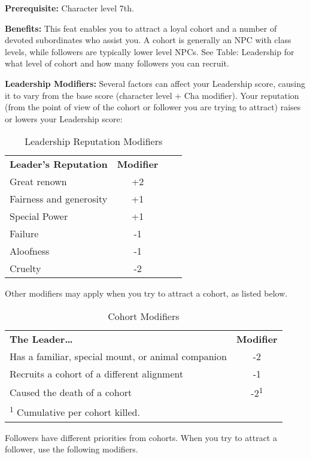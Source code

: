 \textbf{Prerequisite:} Character level 7th.
				
\textbf{Benefits:} This feat enables you to attract a loyal cohort and a number of devoted subordinates who assist you. A cohort is generally an NPC with class levels, while followers are typically lower level NPCs. See Table: Leadership for what level of cohort and how many followers you can recruit.
				
\textbf{Leadership Modifiers:} Several factors can affect your Leadership score, causing it to vary from the base score (character level + Cha modifier). Your reputation (from the point of view of the cohort or follower you are trying to attract) raises or lowers your Leadership score:
				
\begin{table}[htb]
\sffamily
{}
\caption{Leadership Reputation Modifiers}
\centering
\begin{tabular}{l c c c}
\textbf{Leader's Reputation} & \textbf{Modifier}\\
Great renown & +2\\
Fairness and generosity & +1\\
Special Power & +1\\
Failure & -1 \\
Aloofness & -1\\
Cruelty & -2\\
\end{tabular}
\end{table}
				
Other modifiers may apply when you try to attract a cohort, as listed below.\newline

\begin{table}[htb]
\sffamily
{}
\caption{Cohort Modifiers}
\centering
\begin{tabular}{l c}
\textbf{The Leader\ldots{}} & \textbf{Modifier}\\
Has a familiar, special mount, or animal companion & -2\\
Recruits a cohort of a different alignment & -1\\
Caused the death of a cohort & -2\textsuperscript{1}\\
\multicolumn{2}{l}{\textsuperscript{1} Cumulative per cohort killed.}\\
\end{tabular}
\end{table}

				
Followers have different priorities from cohorts. When you try to attract a follower, use the following modifiers.\newline

